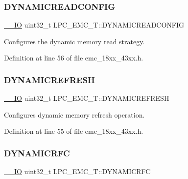 \subsubsection{\texorpdfstring{D\+Y\+N\+A\+M\+I\+C\+R\+E\+A\+D\+C\+O\+N\+F\+IG}{DYNAMICREADCONFIG}}
{\footnotesize\ttfamily \hyperlink{core__sc300_8h_aec43007d9998a0a0e01faede4133d6be}{\+\_\+\+\_\+\+IO} uint32\+\_\+t L\+P\+C\+\_\+\+E\+M\+C\+\_\+\+T\+::\+D\+Y\+N\+A\+M\+I\+C\+R\+E\+A\+D\+C\+O\+N\+F\+IG}

Configures the dynamic memory read strategy. 

Definition at line 56 of file emc\+\_\+18xx\+\_\+43xx.\+h.

\mbox{\label{struct_l_p_c___e_m_c___t_a793d252ba22ec723b8fe50a731a5dbb7}} 
\subsubsection{\texorpdfstring{D\+Y\+N\+A\+M\+I\+C\+R\+E\+F\+R\+E\+SH}{DYNAMICREFRESH}}
{\footnotesize\ttfamily \hyperlink{core__sc300_8h_aec43007d9998a0a0e01faede4133d6be}{\+\_\+\+\_\+\+IO} uint32\+\_\+t L\+P\+C\+\_\+\+E\+M\+C\+\_\+\+T\+::\+D\+Y\+N\+A\+M\+I\+C\+R\+E\+F\+R\+E\+SH}

Configures dynamic memory refresh operation. 

Definition at line 55 of file emc\+\_\+18xx\+\_\+43xx.\+h.

\mbox{\label{struct_l_p_c___e_m_c___t_aa13bc7b510fe50432526a6bcfaef46d0}} 
\subsubsection{\texorpdfstring{D\+Y\+N\+A\+M\+I\+C\+R\+FC}{DYNAMICRFC}}
{\footnotesize\ttfamily \hyperlink{core__sc300_8h_aec43007d9998a0a0e01faede4133d6be}{\+\_\+\+\_\+\+IO} uint32\+\_\+t L\+P\+C\+\_\+\+E\+M\+C\+\_\+\+T\+::\+D\+Y\+N\+A\+M\+I\+C\+R\+FC}


